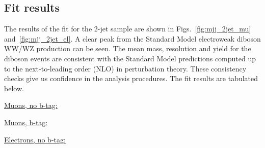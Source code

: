 \subsection{Fit results}
\label{sec:mjj_2jetfit}
The results of the fit for the 2-jet sample are shown 
in Figs.~\ref{fig:mjj_2jet_mu} and~\ref{fig:mjj_2jet_el}. 
A clear peak from the Standard Model electroweak diboson 
WW/WZ production can be seen. 
The mean mass, resolution and yield for the diboson events are 
consistent with the Standard Model predictions computed up to 
the next-to-leading order (NLO) in perturbation theory.
These consistency checks give us confidence in the analysis procedures.
The fit results are tabulated below.

\underline{Muons, no b-tag:}
{\tiny

}

\underline{Muons, b-tag:}
{\tiny

}

\underline{Electrons, no b-tag:}
{\tiny

}

